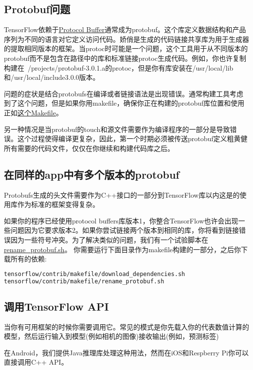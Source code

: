 \subsection{Protobuf问题}
TensorFlow依赖于\href{https://developers.google.com/protocol-buffers/}{Protocol Buffer}通常成为protobuf。这个库定义数据结构和产品序列为不同的语言对它定义访问代码。娇俏是生成的代码链接共享库为用于生成器的提取相同版本的框架。当protoc时可能是一个问题，这个工具用于从不同版本的protobuf而不是包含在路径中的库和标准链接protoc生成代码。例如，你也许复制构建在~/projects/protobuf-3.0.1.a的protoc，但是你有库安装在/usr/local/lib和/usr/local/include3.0.0版本。

问题的症状是结合protobufs在编译或者链接语法是出现错误。通常构建工具考虑到了这个问题，但是如果你用makefile，确保你正在构建的protobuf库位置和使用正如\href{https://github.com/tensorflow/tensorflow/blob/master/tensorflow/contrib/makefile/Makefile#L18}{这个Makefile}。

另一种情况是当protobuf的touch和源文件需要作为编译程序的一部分是导致错误。这个过程使得编译更复杂，因此，第一个时期必须被传送protobuf定义粗黄健所有需要的代码文件，仅仅在你继续和构建代码库之后。

\subsection{在同样的app中有多个版本的protobuf}
Protobufs生成的头文件需要作为C++接口的一部分到TensorFlow库以内这是的使用库作为标准的框架变得复杂。

如果你的程序已经使用protocol buffers库版本1，你整合TensorFlow也许会出现一些问题因为它要求版本2。如果你尝试链接两个版本到相同的库，你将看到链接错误因为一些符号冲突。为了解决类似的问题，我们有一个试验脚本在\href{https://github.com/tensorflow/tensorflow/blob/master/tensorflow/contrib/makefile/rename_protobuf.sh}{rename\_protobuf.sh}。
你需要运行下面目录作为makefile构建的一部分，之后你下载所有的依赖:
\begin{lstlisting}[language=Bash]
tensorflow/contrib/makefile/download_dependencies.sh
tensorflow/contrib/makefile/rename_protobuf.sh 
\end{lstlisting}
\subsection{调用TensorFlow API}
当你有可用框架的时候你需要调用它。常见的模式是你先载入你的代表数值计算的模型，然后运行输入到模型(例如相机的图像)接收输出(例如，预测标签)

在Android，我们提供Java推理库处理这种用法，然而在iOS和Respberry Pi你可以直接调用C++ API。
